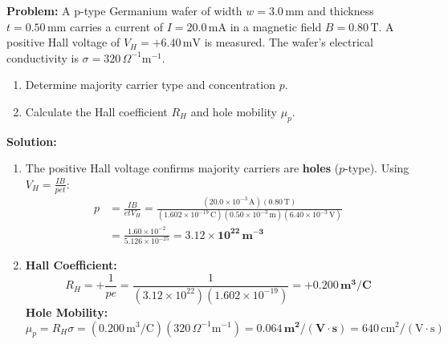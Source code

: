 \begin{examplebox}
\textbf{Problem:} A p-type Germanium wafer of width $w = 3.0\,\text{mm}$ and thickness $t = 0.50\,\text{mm}$ carries a current of $I = 20.0\,\text{mA}$ in a magnetic field $B = 0.80\,\text{T}$. A positive Hall voltage of $V_H = +6.40\,\text{mV}$ is measured. The wafer's electrical conductivity is $\sigma = 320\,\Omega^{-1}\text{m}^{-1}$.
\begin{enumerate}[label=(\alph*)]
    \item Determine majority carrier type and concentration $p$.
    \item Calculate the Hall coefficient $R_H$ and hole mobility $\mu_p$.
\end{enumerate}

\textbf{Solution:}
\begin{enumerate}[label=(\alph*)]
    \item The positive Hall voltage confirms majority carriers are \textbf{holes} ($p$-type).
    Using $V_H = \frac{I B}{p e t}$:
    \begin{align}
        p &= \frac{I B}{e t V_H} = \frac{(20.0 \times 10^{-3}\,\text{A})(0.80\,\text{T})}{(1.602 \times 10^{-19}\,\text{C})(0.50 \times 10^{-3}\,\text{m})(6.40 \times 10^{-3}\,\text{V})} \\
        &= \frac{1.60 \times 10^{-2}}{5.126 \times 10^{-25}} = \mathbf{3.12 \times 10^{22}\,\text{m}^{-3}}
    \end{align}
    \item \textbf{Hall Coefficient:}
    \begin{equation}
        R_H = +\frac{1}{p e} = \frac{1}{(3.12 \times 10^{22})(1.602 \times 10^{-19})} = +\mathbf{0.200\,\text{m}^3/\text{C}}
    \end{equation}
    \textbf{Hole Mobility:}
    \begin{equation}
        \mu_p = R_H \sigma = (0.200\,\text{m}^3/\text{C})(320\,\Omega^{-1}\text{m}^{-1}) = \mathbf{0.064\,\text{m}^2/(\text{V}\cdot\text{s})} = 640\,\text{cm}^2/(\text{V}\cdot\text{s})
    \end{equation}
\end{enumerate}
\end{examplebox}

